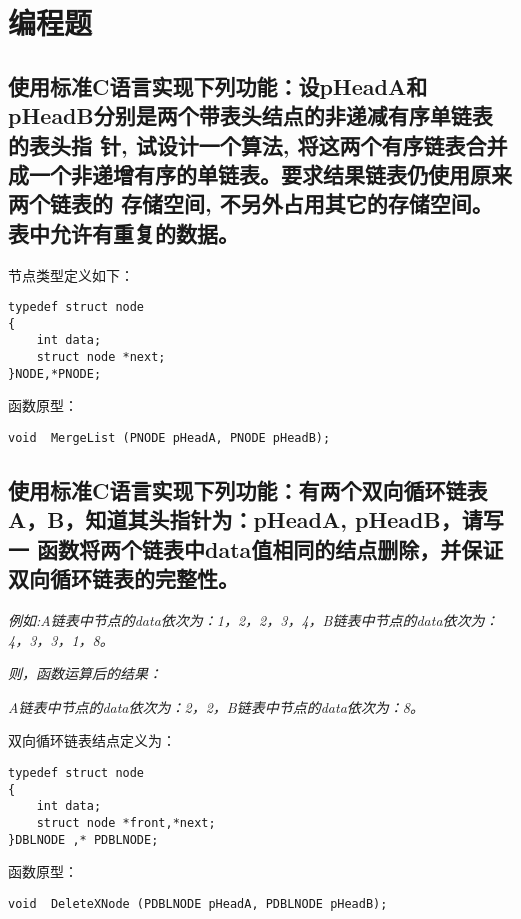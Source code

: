 ﻿\documentclass  [11pt,twocolumn,landscape]{article}
\begin{document}
\pagebreak

\begin{minipage}{0.41\textwidth}
\section{编程题}
\subsection{使用标准C语言实现下列功能：设pHeadA和pHeadB分别是两个带表头结点的非递减有序单链表的表头指
  针, 试设计一个算法, 将这两个有序链表合并成一个非递增有序的单链表。要求结果链表仍使用原来两个链表的
  存储空间, 不另外占用其它的存储空间。表中允许有重复的数据。}
节点类型定义如下：
\begin{lstlisting}
typedef struct node
{
    int data;
    struct node *next;
}NODE,*PNODE;
\end{lstlisting}
函数原型：
\begin{lstlisting}
void  MergeList (PNODE pHeadA, PNODE pHeadB);
\end{lstlisting}
\end{minipage}

\pagebreak
\begin{minipage}{0.41\textwidth}
\vspace{40ex}
\subsection{使用标准C语言实现下列功能：有两个双向循环链表A，B，知道其头指针为：pHeadA, pHeadB，请写一
  函数将两个链表中data值相同的结点删除，并保证双向循环链表的完整性。}

\begin{minipage}{0.9\textwidth}
\vspace{1ex}
\small{\textit{例如:A链表中节点的data依次为：1，2，2，3，4，B链表中节点的data依次为：4，3，3，1，8。}}

\small{\textit{则，函数运算后的结果：}}

\small{\textit{A链表中节点的data依次为：2，2，B链表中节点的data依次为：8。}}
\vspace{2ex}
\end{minipage}

双向循环链表结点定义为：
\begin{lstlisting}
typedef struct node
{
    int data;
    struct node *front,*next;
}DBLNODE ,* PDBLNODE;
\end{lstlisting}
函数原型：
\begin{lstlisting}
void  DeleteXNode (PDBLNODE pHeadA, PDBLNODE pHeadB); 
\end{lstlisting}
\end{minipage}
\end{document}

